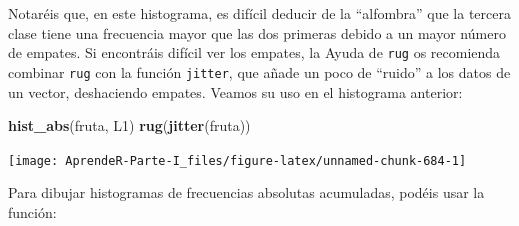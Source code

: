 \documentclass[]{book}
\newenvironment{Shaded}{\begin{snugshade}}{\end{snugshade}}
\newcommand{\ControlFlowTok}[1]{\textcolor[rgb]{0.13,0.29,0.53}{\textbf{#1}}}
\newcommand{\DataTypeTok}[1]{\textcolor[rgb]{0.13,0.29,0.53}{#1}}
\newcommand{\DecValTok}[1]{\textcolor[rgb]{0.00,0.00,0.81}{#1}}
\newcommand{\FloatTok}[1]{\textcolor[rgb]{0.00,0.00,0.81}{#1}}
\newcommand{\KeywordTok}[1]{\textcolor[rgb]{0.13,0.29,0.53}{\textbf{#1}}}
\newcommand{\NormalTok}[1]{#1}
\newcommand{\OperatorTok}[1]{\textcolor[rgb]{0.81,0.36,0.00}{\textbf{#1}}}
\newcommand{\OtherTok}[1]{\textcolor[rgb]{0.56,0.35,0.01}{#1}}
\newcommand{\StringTok}[1]{\textcolor[rgb]{0.31,0.60,0.02}{#1}}
\theoremstyle{definition}
\theoremstyle{definition}
\theoremstyle{definition}
\theoremstyle{remark}
\begin{document}
Notaréis que, en este histograma, es difícil deducir de la ``alfombra'' que la tercera clase tiene una frecuencia mayor que las dos primeras debido a un mayor número de empates. Si encontráis difícil ver los empates, la Ayuda de \texttt{rug} os recomienda combinar \texttt{rug} con la función \texttt{jitter}, que añade un poco de ``ruido'' a los datos de un vector, deshaciendo empates. Veamos su uso en el histograma anterior:

\begin{Shaded}
\begin{Highlighting}[]
\KeywordTok{hist_abs}\NormalTok{(fruta, L1)}
\KeywordTok{rug}\NormalTok{(}\KeywordTok{jitter}\NormalTok{(fruta))}
\end{Highlighting}
\end{Shaded}

\begin{center}\texttt{[image: AprendeR-Parte-I\_files/figure-latex/unnamed-chunk-684-1]} \end{center}

Para dibujar histogramas de frecuencias absolutas acumuladas, podéis usar la función:

\begin{Shaded}
\end{Shaded}
\end{document}
